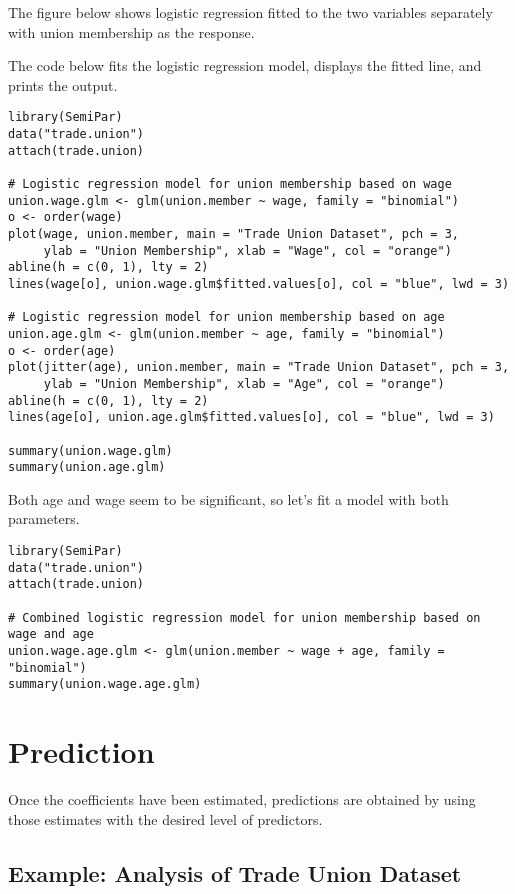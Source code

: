 \documentclass[11pt]{article}
\begin{document}
The figure below shows logistic regression fitted to the two variables separately with union membership as the response.

The code below fits the logistic regression model, displays the fitted line, and prints the output.

\begin{verbatim}
library(SemiPar)
data("trade.union")
attach(trade.union)

# Logistic regression model for union membership based on wage
union.wage.glm <- glm(union.member ~ wage, family = "binomial")
o <- order(wage)
plot(wage, union.member, main = "Trade Union Dataset", pch = 3,
     ylab = "Union Membership", xlab = "Wage", col = "orange")
abline(h = c(0, 1), lty = 2)
lines(wage[o], union.wage.glm$fitted.values[o], col = "blue", lwd = 3)

# Logistic regression model for union membership based on age
union.age.glm <- glm(union.member ~ age, family = "binomial")
o <- order(age)
plot(jitter(age), union.member, main = "Trade Union Dataset", pch = 3,
     ylab = "Union Membership", xlab = "Age", col = "orange")
abline(h = c(0, 1), lty = 2)
lines(age[o], union.age.glm$fitted.values[o], col = "blue", lwd = 3)

summary(union.wage.glm)
summary(union.age.glm)
\end{verbatim}

Both age and wage seem to be significant, so let's fit a model with both parameters.

\begin{verbatim}
library(SemiPar)
data("trade.union")
attach(trade.union)

# Combined logistic regression model for union membership based on wage and age
union.wage.age.glm <- glm(union.member ~ wage + age, family = "binomial")
summary(union.wage.age.glm)
\end{verbatim}

\section{Prediction}

Once the coefficients have been estimated, predictions are obtained by using those estimates with the desired level of predictors.

\subsection{Example: Analysis of Trade Union Dataset}
\end{document}
